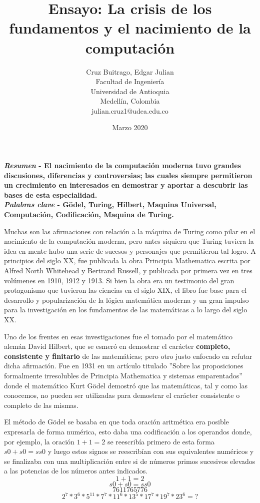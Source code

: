 \documentclass{article}
\title{Ensayo: La crisis de los fundamentos y el nacimiento de la computación}
\author{Cruz Buitrago, Edgar Julian \\ Facultad de Ingeniería \\ 
        Universidad de Antioquia \\ Medellín, Colombia \\
        julian.cruz1@udea.edu.co}
\date{Marzo 2020}
\begin{document}
\maketitle
\begin{multicols}{2}
    \justify
        \textbf{\textit{Resumen} - El nacimiento de la computación moderna tuvo grandes discusiones, diferencias y controversias; las cuales siempre permitieron un crecimiento en interesados en demostrar y aportar a descubrir las bases de esta especialidad.}
        \textbf{\\ \textit{Palabras clave} - Gödel, Turing, Hilbert, Maquina Universal, Computación, Codificación, Maquina de Turing.} 
        
        \vspace{\baselineskip}
    
        Muchas son las afirmaciones con relación a la máquina de Turing como pilar en el nacimiento de la computación moderna, pero antes siquiera que Turing tuviera la idea en mente hubo una serie de sucesos y personajes que permitieron tal logro. A principios del siglo XX, fue publicada la obra Principia Mathematica escrita por Alfred North Whitehead y Bertrand Russell, y publicada por primera vez en tres volúmenes en 1910, 1912 y 1913. Si bien la obra era un testimonio del gran protagonismo que tuvieron las ciencias en el siglo XIX, el libro fue base para el desarrollo y popularización de la lógica matemática moderna y un gran impulso para la investigación en los fundamentos de las matemáticas a lo largo del siglo XX.\cite{principia}
        
        \vspace{\baselineskip}
        
        Uno de los frentes en esas investigaciones fue el tomado por el matemático alemán David Hilbert, que se esmeró en demostrar el carácter \textbf{completo, consistente y finitario} de las matemáticas; pero otro justo enfocado en refutar dicha afirmación.\cite{bbva}  Fue en 1931 en un artículo titulado ''Sobre las proposiciones formalmente irresolubles de Principia Mathematica y sistemas emparentados'' donde el matemático Kurt Gödel demostró que las matemáticas, tal y como las conocemos, no pueden ser utilizadas para demostrar el carácter consistente o completo de las mismas.
        
        \vspace{\baselineskip}
        
        El método de Gödel se basaba en que toda oración aritmética era posible expresarla de forma numérica, esto daba una {codificación} a los operandos donde, por ejemplo, la oración \(1 + 1 = 2\) se reescribía primero de esta forma \(s0 + s0 = ss0\) y luego estos signos se reescribían con sus equivalentes numéricos y se finalizaba con una multiplicación entre si de números primos sucesivos elevados a las potencias de los números antes indicados.
        \[1 + 1 = 2\]
        \[s0 + s0 = ss0\]
        \[76 11 76 5 776\]
        \[2^7 * 3^6 * 5^11 * 7^7 * 11^6 * 13^5 * 17^7 * 19^7 * 23^6 = ?\]
        

\end{multicols}
\end{document}
